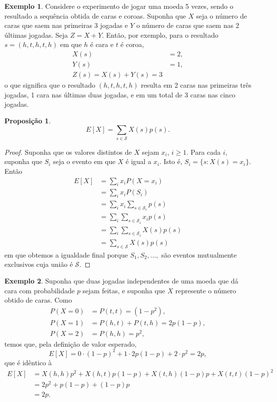 \documentclass[]{book}
\newtheorem{proposition}{Proposição}[chapter]
\theoremstyle{definition}
\theoremstyle{definition}
\newtheorem{example}{Exemplo}[chapter]
\theoremstyle{definition}
\theoremstyle{remark}
\begin{document}
\begin{example}
\protect\hypertarget{exm:unnamed-chunk-199}{}{\label{exm:unnamed-chunk-199} }Considere o experimento de jogar uma moeda 5 vezes, sendo o resultado a sequência obtida de caras e coroas.
Suponha que \(X\) seja o número de caras que saem nas primeiras 3 jogadas e \(Y\) o número de caras que saem nas 2 últimas jogadas.
Seja \(Z = X + Y\).
Então, por exemplo, para o resultado \(s = (h, t, h, t, h)\) em que \(h\) é cara e \(t\) é coroa,
\begin{align*}
  X(s) &= 2,\\
  Y(s) &= 1,\\
  Z(s) = X(s) + Y(s) = 3
\end{align*}
o que significa que o resultado \((h, t, h, t, h)\) resulta em 2 caras nas primeiras três jogadas, 1 cara nas últimas duas jogadas, e em um total de 3 caras nas cinco jogadas.
\end{example}

\begin{proposition}
\protect\hypertarget{prp:propSoma1}{}{\label{prp:propSoma1} }\[E[X]=\sum_{s\in\mathcal{S}}X(s)p(s).\]
\end{proposition}

\begin{proof}
\iffalse{} {Prova. } \fi{}Suponha que os valores distintos de \(X\) sejam \(x_i\), \(i\geq 1\).
Para cada \(i\), suponha que \(S_i\) seja o evento em que \(X\) é igual a \(x_i\).
Isto é, \(S_i=\{s:X(s)=x_i\}\).
Então
\begin{align*}
  E[X] &= \sum_i x_iP(X=x_i)\\
  &= \sum_i x_iP(S_i)\\
  &= \sum_i x_i \sum_{s\in\mathcal{S_i}} p(s)\\
  &= \sum_i \sum_{s\in\mathcal{S_i}} x_ip(s)\\
  &= \sum_i \sum_{s\in\mathcal{S_i}} X(s)p(s)\\
  &= \sum_{s\in\mathcal{S}} X(s)p(s)
\end{align*}
em que obtemos a igualdade final porque \(S_1, S_2, \ldots,\) são eventos mutualmente exclusivos cuja união é \(\mathcal{S}.\)
\end{proof}

\begin{example}
\protect\hypertarget{exm:unnamed-chunk-201}{}{\label{exm:unnamed-chunk-201} }Suponha que duas jogadas independentes de uma moeda que dá cara com probabilidade \(p\) sejam feitas, e suponha que \(X\) represente o número obtido de caras. Como
\begin{align*}
P(X=0) &= P(t,t) = (1-p^2), \\
P(X=1) &= P(h,t) + P(t,h) = 2p(1-p),\\
P(X=2) &= P(h,h) = p^2,
\end{align*}
temos que, pela definição de valor esperado,
\[E[X]=0\cdot (1-p)^2 + 1\cdot 2p(1-p) + 2\cdot p^2 = 2p,\]
que é idêntico à
\begin{align*}
  E[X] &= X(h,h)p^2 + X(h,t)p(1-p) + X(t,h)(1-p)p + X(t,t)(1-p)^2\\
  &= 2p^2 + p(1-p) + (1-p)p\\
  &= 2p.
\end{align*}
\end{example}
\end{document}

